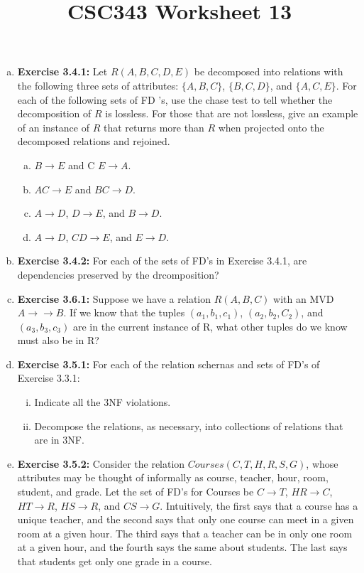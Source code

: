 \documentclass[12pt]{article}
\begin{document}
\title{CSC343 Worksheet 13}
\maketitle

\begin{enumerate}[a)]
    \item \textbf{Exercise 3.4.1:} Let $R(A, B, C, D, E)$ be decomposed into relations with the
    following three sets of attributes: $\{A, B, C\}$, $\{B, C, D\}$, and $\{A, C, E\}$. For each
    of the following sets of FD 's, use the chase test to tell whether the decomposition
    of $R$ is lossless. For those that are not lossless, give an example of an instance
    of $R$ that returns more than $R$ when projected onto the decomposed relations
    and rejoined.

    \begin{enumerate}[a)]
        \item $B \to E$ and C $E \to A$.
        \item $AC \to E$ and $BC \to D$.
        \item $A \to D$, $D \to E$, and $B \to D$.
        \item $A \to D$, $CD \to E$, and $E \to D$.
    \end{enumerate}

    \item \textbf{Exercise 3.4.2:} For each of the sets of FD's in Exercise 3.4.1,
    are dependencies preserved by the drcomposition?

    \item \textbf{Exercise 3.6.1:} Suppose we have a relation $R(A, B, C)$ with an
    MVD $A \to\to B$. If we know that the tuples $(a_1, b_1, c_1)$, $(a_2, b_2, C_2)$, and $(a_3, b_3, c_3)$
    are in the current instance of R, what other tuples do we know must also be in R?

    \item \textbf{Exercise 3.5.1:} For each of the relation schernas and sets of FD's of Exercise
    3.3.1:

    \bigskip

    \begin{enumerate}[i)]
        \item Indicate all the 3NF violations.
        \item Decompose the relations, as necessary, into collections of relations that are in 3NF.
    \end{enumerate}

    \item \textbf{Exercise 3.5.2:} Consider the relation $Courses(C, T, H, R, S, G)$,
    whose attributes may be thought of informally as course, teacher, hour, room, student,
    and grade. Let the set of FD's for Courses be $C\to T$, $HR\to C$, $HT\to R$,
    $HS\to R$, and $CS\to G$. Intuitively, the first says that a course has a unique
    teacher, and the second says that only one course can meet in a given room at
    a given hour. The third says that a teacher can be in only one room at a given
    hour, and the fourth says the same about students. The last says that students
    get only one grade in a course.


\end{enumerate}
\end{document}
